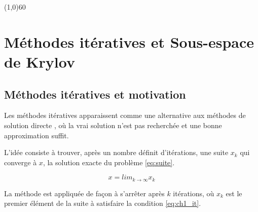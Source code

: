 \documentclass[a4paper, 15pt]{report}
\renewcommand{\indent}[1]{\setlength{\parindent}{#1}}
\begin{document}

    \thispagestyle{empty}
    \addtocounter{page}{-1}

    \indent{0mm} 

    \begin{minipage}{\linewidth}
        
    \end{minipage}

    \vspace{5cm}

    \begin{center}
        \fontsize{16pt}{24pt} 

        \vspace{1.8cm} \line(1,0){60} \vspace{2cm}

        \fontsize{12pt}{18pt} 
    \end{center}

    \newpage \restoregeometry

    \tableofcontents \newpage

    \chapter{Méthodes itératives et Sous-espace de Krylov }
    \section{Méthodes itératives et motivation}
    Les méthodes itératives apparaissent comme une alternative aux méthodes de solution directe , où la vrai solution n'est pas recherchée et une bonne approximation suffit.

    L'idée consiste à trouver, après un nombre définit d'itérations, une suite ${x_{k}}$ qui converge à $x$, la solution exacte du problème \ref{eq:suite}.

    \begin{equation}\label{eq:suite}
        x = lim_{k \to \infty} x_{k}
    \end{equation}

    La méthode est appliquée de façon à s'arrêter après $k$ itérations, où $x_{k}$ est le premier élément de la suite à satisfaire la condition \ref{eq:ch1_it}.
\end{document}
